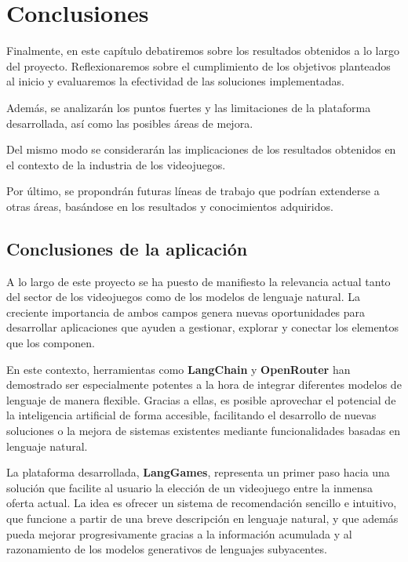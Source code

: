 \chapter{Conclusiones}

Finalmente, en este capítulo debatiremos sobre los resultados obtenidos a lo largo del proyecto. Reflexionaremos sobre el cumplimiento de los objetivos planteados al inicio y evaluaremos la efectividad de las soluciones implementadas. 

Además, se analizarán los puntos fuertes y las limitaciones de la plataforma desarrollada, así como las posibles áreas de mejora. 


Del mismo modo se considerarán las implicaciones de los resultados obtenidos en el contexto de la industria de los videojuegos. 


Por último, se propondrán futuras líneas de trabajo que podrían extenderse a otras áreas, basándose en los resultados y conocimientos adquiridos.  

\newpage

\section{Conclusiones de la aplicación}

A lo largo de este proyecto se ha puesto de manifiesto la relevancia actual tanto del sector de los videojuegos como de los modelos de lenguaje natural. La creciente importancia de ambos campos genera nuevas oportunidades para desarrollar aplicaciones que ayuden a gestionar, explorar y conectar los elementos que los componen.

En este contexto, herramientas como \textbf{LangChain} y \textbf{OpenRouter} han demostrado ser especialmente potentes a la hora de integrar diferentes modelos de lenguaje de manera flexible. Gracias a ellas, es posible aprovechar el potencial de la inteligencia artificial de forma accesible, facilitando el desarrollo de nuevas soluciones o la mejora de sistemas existentes mediante funcionalidades basadas en lenguaje natural.

La plataforma desarrollada, \textbf{LangGames}, representa un primer paso hacia una solución que facilite al usuario la elección de un videojuego entre la inmensa oferta actual. La idea es ofrecer un sistema de recomendación sencillo e intuitivo, que funcione a partir de una breve descripción en lenguaje natural, y que además pueda mejorar progresivamente gracias a la información acumulada y al razonamiento de los modelos generativos de lenguajes subyacentes.

